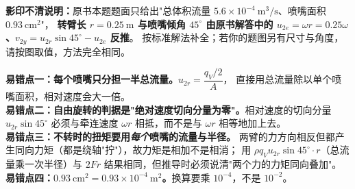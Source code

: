 \begin{tishi}
\textbf{影印不清说明：}原书本题题面只给出"总体积流量 $5.6\times10^{-4}\ \mathrm{m^3/s}$、喷嘴面积 $0.93\ \mathrm{cm^2}$"，
\textbf{转臂长 $r=0.25\ \mathrm{m}$ 与喷嘴倾角 $45^\circ$ 由原书解答中的
$u_{2e}=\omega r=0.25\omega$、$v_{2y}=u_{2r}\sin45^\circ-u_{2e}$ 反推}。
按标准解法补全；若你的题图另有尺寸与角度，请按图取值，方法完全相同。
\end{tishi}

\begin{yicuo}
\textbf{易错点一：每个喷嘴只分担一半总流量。}$u_{2r}=\dfrac{q_V/2}{A}$，
直接用总流量除以单个喷嘴面积，相对速度会大一倍。\\
\textbf{易错点二：自由旋转的判据是"绝对速度切向分量为零"。}相对速度的切向分量 $u_{2r}\sin45^\circ$
必须与牵连速度 $\omega r$ 相抵，而不是与 $\omega r$ 相等地加上去。\\
\textbf{易错点三：不转时的扭矩要用\emph{每个}喷嘴的流量与半径。}
两臂的力方向相反但都产生同向力矩（都是绕轴"拧"），故力矩是相加不是相消；
用 $\rho q_Vu_{2r}\sin45^\circ\cdot r$（总流量乘一次半径）与 $2Fr$ 结果相同，但推导时必须说清"两个力的力矩同向叠加"。\\
\textbf{易错点四：$0.93\ \mathrm{cm^2}=0.93\times10^{-4}\ \mathrm{m^2}$。}换算要乘 $10^{-4}$，不是 $10^{-2}$。
\end{yicuo}
